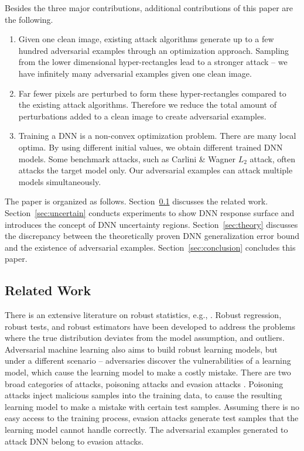 \documentclass[12pt]{article}
\begin{document}
Besides the three major contributions, additional contributions of
this paper are the following. 
%
\begin{enumerate}
\item Given one clean image, existing attack algorithms generate up to 
  a few hundred adversarial examples through an optimization
  approach. Sampling from the lower dimensional hyper-rectangles lead
  to a stronger attack -- we have infinitely
  many adversarial examples given one clean image. 

\item Far fewer pixels are perturbed to form these
  hyper-rectangles compared to the existing attack
  algorithms. Therefore we reduce the total
  amount of perturbations added to a clean image to create
  adversarial examples.    

\item Training a DNN is a non-convex optimization problem. There are
  many local optima. By using different initial values, we obtain
  different trained DNN models. Some benchmark attacks, such as
  Carlini \& Wagner $L_2$ attack, often attacks the target
  model only. Our adversarial examples can attack 
  multiple models simultaneously.
  
\end{enumerate}  

The paper is organized as follows. Section~\ref{sec:related} discusses 
the related work. Section~\ref{sec:uncertain} conducts experiments to show
DNN response surface and introduces the concept of DNN uncertainty
regions. Section~\ref{sec:theory} discusses the 
discrepancy between the theoretically proven DNN generalization error bound and the existence
of adversarial examples. 
Section~\ref{sec:conclusion} concludes this paper. 

%
\subsection{Related Work}
\label{sec:related}

There is an extensive literature on robust statistics, e.g.,
\cite{robust-2004,robust-2000}.
Robust regression, robust tests, and robust estimators have been developed to address
the problems where the true distribution deviates from the
model assumption, and outliers. Adversarial machine learning
also aims to build robust learning models, but under a  
different scenario -- adversaries discover the vulnerabilities of a
learning model, which cause the learning
model to make a costly mistake. There
are two broad categories of attacks, poisoning attacks and evasion
attacks \cite{xi-wires-2020}. Poisoning attacks inject malicious
samples into the training data, to cause the resulting learning model
to make a mistake with certain test samples. Assuming there is no easy
access to the training process, evasion attacks generate test samples
that the learning model cannot handle correctly. The adversarial
examples generated to attack DNN belong to evasion attacks.   
\end{document}
